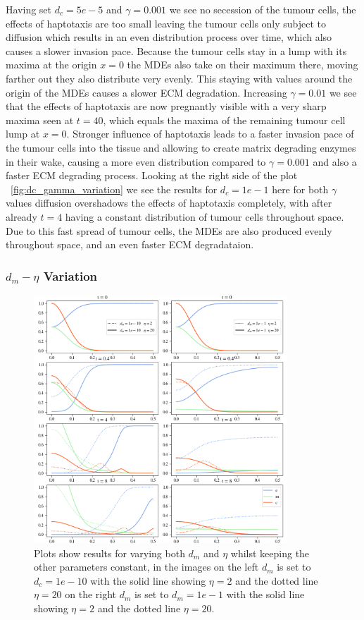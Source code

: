 Having set $d_c=5e-5$ and $\gamma=0.001$ we see no secession of the tumour cells, the effects of haptotaxis are too small leaving the tumour cells only subject to diffusion which results in an even distribution process over time, which also causes a slower invasion pace. Because the tumour cells stay in a lump with its maxima at the origin $x=0$ the MDEs also take on their maximum there, moving farther out they also distribute very evenly. This staying with values around the origin of the MDEs causes a slower ECM degradation. Increasing $\gamma=0.01$ we see that the effects of haptotaxis are now pregnantly visible with a very sharp maxima seen at $t=40$, which equals the maxima of the remaining tumour cell lump at $x=0$. Stronger influence of haptotaxis leads to a faster invasion pace of the tumour cells into the tissue and allowing to create matrix degrading enzymes in their wake, causing a more even distribution compared to $\gamma=0.001$ and also a faster ECM degrading process. 
Looking at the right side of the plot ~\ref{fig:dc_gamma_variation} we see the results for $d_c=1e-1$ here for both $\gamma$ values diffusion overshadows the effects of haptotaxis completely, with after already $t=4$ having a constant distribution of tumour cells throughout space. Due to this fast spread of tumour cells, the MDEs are also produced evenly throughout space, and an even faster ECM degradataion. 

\subsubsection*{$d_m - \eta$ Variation}
\begin{figure}[h]
    \centering
    \includegraphics[width=0.85\textwidth]{resources/images/dm_eta_variation.png}
    \caption{Plots show results for varying both $d_m$ and $\eta$ whilst keeping the other parameters constant, in the images on the left $d_m$ is set to $d_c=1e-10$ with the solid line showing $\eta = 2$ and the dotted line $\eta=20$ on the right $d_m$ is set to $d_m=1e-1$ with the solid line showing $\eta = 2$ and the dotted line $\eta=20$.}
    \label{fig:dm_eta_variation}
\end{figure}

